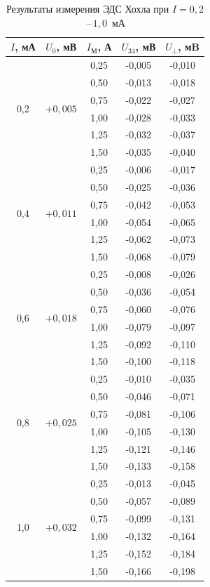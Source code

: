 \documentclass[a4paper,12pt]{article} %
\begin{document}
\begin{table}[h!]
\begin{center}
\begin{tabular}{|c|c|c|c|c|}
\hline
$I$, мА & $U_0$, мВ & $I_\text{М}$, А & $U_{34}$, мВ & $U_{\perp}$, мB \\ \hline
\multirow{6}{*}{0,2} & \multirow{6}{*}{$+0,005$} & 0,25 & -0,005 & -0,010 \\ \cline{3-5}
& & 0,50 & -0,013 & -0,018 \\ \cline{3-5}
& & 0,75 & -0,022 & -0,027 \\ \cline{3-5}
& & 1,00 & -0,028 & -0,033 \\ \cline{3-5}
& & 1,25 & -0,032 & -0,037 \\ \cline{3-5}
& & 1,50 & -0,035 & -0,040 \\ \hline
\multirow{6}{*}{0,4} & \multirow{6}{*}{$+0,011$} & 0,25 & -0,006 & -0,017 \\ \cline{3-5}
& & 0,50 & -0,025 & -0,036 \\ \cline{3-5}
& & 0,75 & -0,042 & -0,053 \\ \cline{3-5}
& & 1,00 & -0,054 & -0,065 \\ \cline{3-5}
& & 1,25 & -0,062 & -0,073 \\ \cline{3-5}
& & 1,50 & -0,068 & -0,079 \\ \hline
\multirow{6}{*}{0,6} & \multirow{6}{*}{$+0,018$} & 0,25 & -0,008 & -0,026 \\ \cline{3-5}
& & 0,50 & -0,036 & -0,054 \\ \cline{3-5}
& & 0,75 & -0,060 & -0,076 \\ \cline{3-5}
& & 1,00 & -0,079 & -0,097 \\ \cline{3-5}
& & 1,25 & -0,092 & -0,110 \\ \cline{3-5}
& & 1,50 & -0,100 & -0,118 \\ \hline
\multirow{6}{*}{0,8} & \multirow{6}{*}{$+0,025$} & 0,25 & -0,010 & -0,035 \\ \cline{3-5}
& & 0,50 & -0,046 & -0,071 \\ \cline{3-5}
& & 0,75 & -0,081 & -0,106 \\ \cline{3-5}
& & 1,00 & -0,105 & -0,130 \\ \cline{3-5}
& & 1,25 & -0,121 & -0,146 \\ \cline{3-5}
& & 1,50 & -0,133 & -0,158 \\ \hline
\multirow{6}{*}{1,0} & \multirow{6}{*}{$+0,032$} & 0,25 & -0,013 & -0,045 \\ \cline{3-5}
& & 0,50 & -0,057 & -0,089 \\ \cline{3-5}
& & 0,75 & -0,099 & -0,131 \\ \cline{3-5}
& & 1,00 & -0,132 & -0,164 \\ \cline{3-5}
& & 1,25 & -0,152 & -0,184 \\ \cline{3-5}
& & 1,50 & -0,166 & -0,198 \\ \hline
\end{tabular}
\end{center}
\caption{Результаты измерения ЭДС Хохла при $I = 0,2$\,--\,$1,0$~мА}
\label{tab2}
\end{table}
\end{document}
